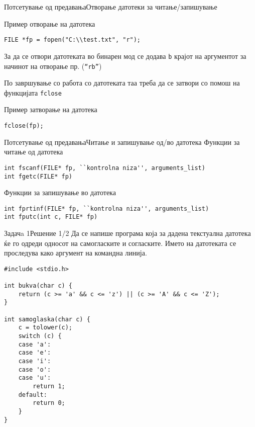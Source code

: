 \begin{frame}[fragile]{Потсетување од предавања}{Отворање датотеки за
читање/запишување}

\begin{exampleblock}{Пример отворање на датотека}
\begin{lstlisting}
FILE *fp = fopen("C:\\test.txt", "r");
\end{lstlisting}
\begin{scriptsize}
За да се отвори датотеката во бинарен мод се додава \texttt{b} крајот на
аргументот за начинот на отворање пр. (\texttt{``rb''})
\end{scriptsize}
\end{exampleblock}
По завршување со работа со датотеката таа треба да се затвори со помош на
функцијата \texttt{fclose}
\begin{exampleblock}{Пример затворање на датотека}
\begin{lstlisting}
fclose(fp);
\end{lstlisting}
\end{exampleblock}
\end{frame}

\begin{frame}[fragile]{Потсетување од предавања}{Читање и запишување од/во
датотека}
Функции за читање од датотека
\begin{lstlisting}
int fscanf(FILE* fp, ``kontrolna niza'', arguments_list)
int fgetc(FILE* fp)
\end{lstlisting}

Функции за запишување во датотека
\begin{lstlisting}
int fprtinf(FILE* fp, ``kontrolna niza'', arguments_list)
int fputc(int c, FILE* fp)
\end{lstlisting}

\end{frame}


\begin{frame}[fragile]{Задачa 1}{Решение 1/2}
Да се напише програма која за дадена текстуална датотека ќе го одреди односот на
самогласките и согласките. Името на датотеката се проследува како аргумент на
командна линија.
\begin{lstlisting}
#include <stdio.h>

int bukva(char c) {
    return (c >= 'a' && c <= 'z') || (c >= 'A' && c <= 'Z');
}

int samoglaska(char c) {
    c = tolower(c);
    switch (c) {
    case 'a':
    case 'e':
    case 'i':
    case 'o':
    case 'u':
        return 1;
    default:
        return 0;
    }
}
\end{lstlisting}
\end{frame}

